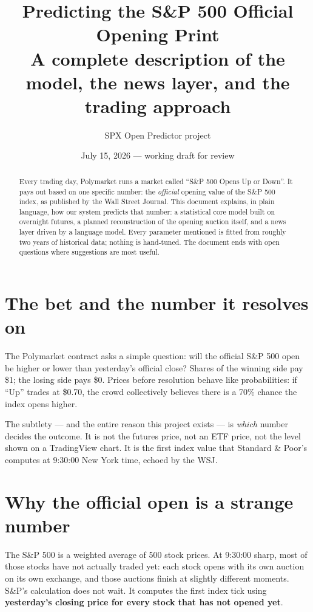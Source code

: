 \documentclass[11pt,a4paper]{article}
\title{Predicting the S\&P 500 Official Opening Print\\
\large A complete description of the model, the news layer, and the trading approach}
\author{SPX Open Predictor project}
\date{July 15, 2026 --- working draft for review}
\begin{document}
\maketitle

\begin{abstract}
Every trading day, Polymarket runs a market called ``S\&P 500 Opens Up or Down''.
It pays out based on one specific number: the \emph{official} opening value of the
S\&P 500 index, as published by the Wall Street Journal. This document explains,
in plain language, how our system predicts that number: a statistical core model
built on overnight futures, a planned reconstruction of the opening auction
itself, and a news layer driven by a language model. Every parameter mentioned
is fitted from roughly two years of historical data; nothing is hand-tuned.
The document ends with open questions where suggestions are most useful.
\end{abstract}

\tableofcontents

\section{The bet and the number it resolves on}

The Polymarket contract asks a simple question: will the official S\&P 500 open
be higher or lower than yesterday's official close? Shares of the winning side
pay \$1; the losing side pays \$0. Prices before resolution behave like
probabilities: if ``Up'' trades at \$0.70, the crowd collectively believes there
is a 70\% chance the index opens higher.

The subtlety --- and the entire reason this project exists --- is \emph{which}
number decides the outcome. It is not the futures price, not an ETF price, not
the level shown on a TradingView chart. It is the first index value that
Standard \& Poor's computes at 9:30:00 New York time, echoed by the WSJ.

\section{Why the official open is a strange number}

The S\&P 500 is a weighted average of 500 stock prices. At 9:30:00 sharp, most
of those stocks have not actually traded yet: each stock opens with its own
auction on its own exchange, and those auctions finish at slightly different
moments. S\&P's calculation does not wait. It computes the first index tick
using \textbf{yesterday's closing price for every stock that has not opened
yet}.
\end{document}
